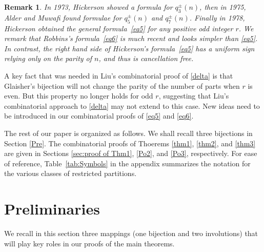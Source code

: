 \documentclass[12pt,reqno]{amsart}
\numberwithin{equation}{section}
\newtheorem{remark}[Theorem]{Remark}
\begin{document}
	\begin{remark}
		In 1973, Hickerson \cite{hickerson1973} showed a formula for $q^{\pm}_{3}(n)$, then in 1975, Alder and Muwafi \cite{alder1975} found formulae for $q^{\pm}_{5}(n)$ and $q^{\pm}_{7}(n)$. Finally in 1978, Hickerson \cite{hickerson1978} obtained the general formula~\eqref{eq5} for any positive odd integer $r$. We remark that Robbins's formula~\eqref{eq6} is much recent and looks simpler than \eqref{eq5}. In contrast, the right hand side of Hickerson's formula~\eqref{eq5} has a uniform sign relying only on the parity of $n$, and thus is cancellation free.
	\end{remark}
	
	 A key fact that was needed in Liu's combinatorial proof of \eqref{delta} is that Glaisher's bijection will not change the parity of the number of parts when $r$ is even. But this property no longer holds for odd $r$, suggesting that Liu's combinatorial approach to \eqref{delta} may not extend to this case. New ideas need to be introduced in our combinatorial proofs of \eqref{eq5} and \eqref{eq6}.

The rest of our paper is organized as follows. We shall recall three bijections in Section \ref{Pre}. The combinatorial proofs of Thoerems \ref{thm1}, \ref{thm2}, and \ref{thm3} are given in Sections \ref{sec:proof of Thm1}, \ref{Po2}, and \ref{Po3}, respectively. For ease of reference, Table~\ref{tab:Symbols} in the appendix summarizes the notation for the various classes of restricted partitions.


\section{Preliminaries\label{Pre}}
We recall in this section three mappings (one bijection and two involutions) that will play key roles in our proofs of the main theorems. 
\end{document}
